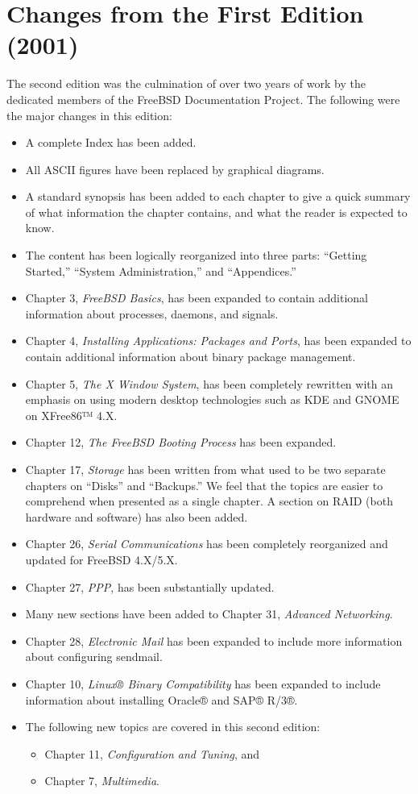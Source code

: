 \section{Changes from the First Edition (2001)}

The second edition was the culmination of over two years of work by the
dedicated members of the FreeBSD Documentation Project.
The following were the major changes in this edition:
\begin{itemize}
\item
   A complete Index has been added.
\item
   All ASCII figures have been replaced by graphical diagrams.
\item
   A standard synopsis has been added to each chapter to give a quick summary of
   what information the chapter contains, and what the reader is expected to
   know.
\item
   The content has been logically reorganized into three parts:
   ``Getting Started,'' ``System Administration,'' and ``Appendices.''
\item
   Chapter 3, \emph{FreeBSD Basics}, has been expanded to contain additional
   information about processes, daemons, and signals.
\item
   Chapter 4, \emph{Installing Applications: Packages and Ports}, has been
   expanded to contain additional information about binary package management.
\item
   Chapter 5, \emph{The X Window System}, has been completely rewritten with an
   emphasis on using modern desktop technologies such as KDE and GNOME on
   XFree86™ 4.X.
\item
   Chapter 12, \emph{The FreeBSD Booting Process} has been expanded.
\item
   Chapter 17, \emph{Storage} has been written from what used to be two separate
   chapters on ``Disks'' and ``Backups.''
   We feel that the topics are easier to comprehend when presented as a single
   chapter.
   A section on RAID (both hardware and software) has also been added.
\item
   Chapter 26, \emph{Serial Communications} has been completely reorganized and
   updated for FreeBSD 4.X/5.X.
\item
   Chapter 27, \emph{PPP}, has been substantially updated.
\item
   Many new sections have been added to Chapter 31, \emph{Advanced Networking}.
\item
   Chapter 28, \emph{Electronic Mail} has been expanded to include more
   information about configuring sendmail.
\item
   Chapter 10, \emph{Linux® Binary Compatibility} has been expanded to include
   information about installing Oracle® and SAP® R/3®.
\item
   The following new topics are covered in this second edition:
   \begin{itemize}
   \item
      Chapter 11, \emph{Configuration and Tuning}, and
   \item
      Chapter 7, \emph{Multimedia}.
   \end{itemize}
\end{itemize}




